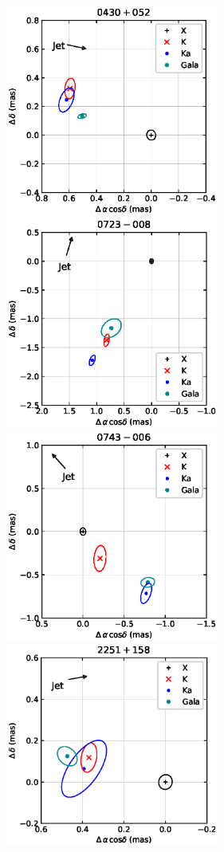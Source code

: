 \documentclass{aa}
\begin{document}
\begin{appendix}

    \begin{figure}[hbtp]
        \centering
        \includegraphics[width=70mm]{figs/0430+052}
        \includegraphics[width=70mm]{figs/0723-008}
        \includegraphics[width=70mm]{figs/0743-006}
        \includegraphics[width=70mm]{figs/2251+158}

\end{figure}
\end{appendix}
\end{document}
